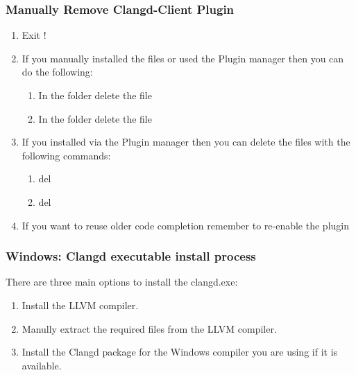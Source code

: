 \subsubsection{Manually Remove Clangd-Client Plugin}

\begin{enumerate}[noitemsep]
\item Exit \codeblocks !
\item If you manually installed the files or used the Plugin manager then you can do the following: 
    \begin{enumerate}[noitemsep]
    \item In the \codeblocks \textbf{} folder delete the  file
    \item In the \codeblocks \textbf{} folder delete the  file
    \end{enumerate}
\item If you installed via the Plugin manager then you can delete the files with the following commands:
    \begin{enumerate}[noitemsep]
    \item del \textbf{}
    \item del \textbf{}
    \end{enumerate}
\item If you want to reuse older code completion remember to re-enable the plugin
\end{enumerate}

\subsubsection{Windows: Clangd executable install process}\label{sec:win_install}

There are three main options to install the clangd.exe:
\begin{enumerate}[noitemsep]
\item Install the LLVM compiler.
\item Manully extract the required files from the LLVM compiler.
\item Install the Clangd package for the Windows compiler you are using if it is available.
\end{enumerate}

